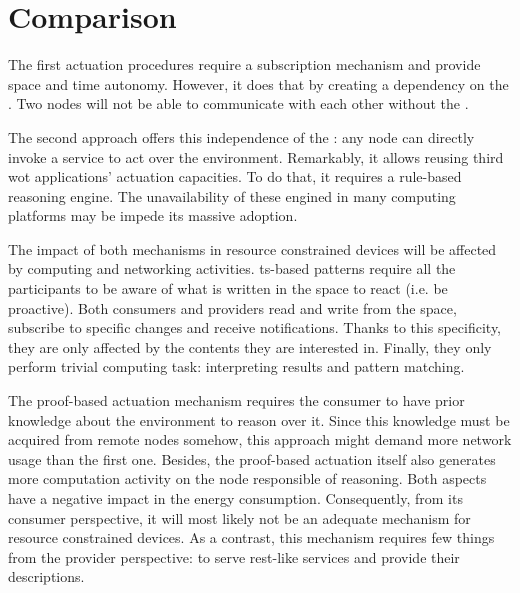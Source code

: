 
\section{Comparison}

The first actuation procedures require a subscription mechanism and provide space and time autonomy.
However, it does that by creating a dependency on the \Space{}.
Two nodes will not be able to communicate with each other without the \Space{}.


The second approach offers this independence of the \Space{}: any node can directly invoke a service to act over the environment.
Remarkably, it allows reusing third \ac{wot} applications' actuation capacities. %
To do that, it requires a rule-based reasoning engine.%
The unavailability of these engined in many computing platforms may be impede its massive adoption. %





\bigskip

The impact of both mechanisms in resource constrained devices will be affected by computing and networking activities.
\ac{ts}-based patterns require all the participants to be aware of what is written in the space to react (i.e. be proactive).
Both consumers and providers read and write from the space, subscribe to specific changes and receive notifications.
Thanks to this specificity, they are only affected by the contents they are interested in. %
Finally, they only perform trivial computing task: interpreting results and pattern matching. %


The proof-based actuation mechanism requires the consumer to have prior knowledge about the environment to reason over it. %
Since this knowledge must be acquired from remote nodes somehow, this approach might demand more network usage than the first one.
Besides, the proof-based actuation itself also generates more computation activity on the node responsible of reasoning.
Both aspects have a negative impact in the energy consumption.
Consequently, from its consumer perspective, it will most likely not be an adequate mechanism for resource constrained devices.
As a contrast, this mechanism requires few things from the provider perspective: to serve \ac{rest}-like services and provide their descriptions. %



